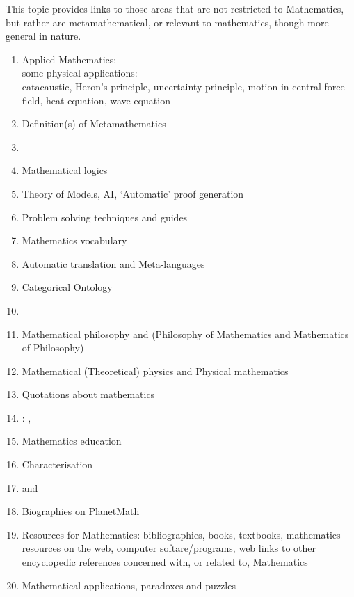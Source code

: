 \documentclass[12pt]{article}
\begin{document}
This topic provides links to those areas that are not restricted to Mathematics, but rather are metamathematical, or relevant to mathematics, though more general in nature.

\begin{enumerate}
\item Applied Mathematics;\\
some physical applications:\\
catacaustic, Heron's principle, uncertainty principle, motion in central-force field, heat equation, wave equation

\item Definition(s) of Metamathematics
\item {}
\item Mathematical logics
\item Theory of Models, AI, `Automatic' proof generation 
\item Problem solving techniques and guides
\item Mathematics vocabulary
\item Automatic translation and Meta-languages
\item Categorical Ontology
\item {}
\item Mathematical philosophy and 
(Philosophy of Mathematics and Mathematics of Philosophy)
\item Mathematical (Theoretical) physics and Physical mathematics
\item Quotations about mathematics
\item {}: , 
\item Mathematics education
\item Characterisation
\item {} and 
\item Biographies on PlanetMath
\item Resources for Mathematics: bibliographies, books, textbooks, mathematics resources on the web, computer softare/programs, web links to other encyclopedic references concerned with, or related to, Mathematics
\item Mathematical applications, paradoxes and puzzles
\end{enumerate}
\end{document}
